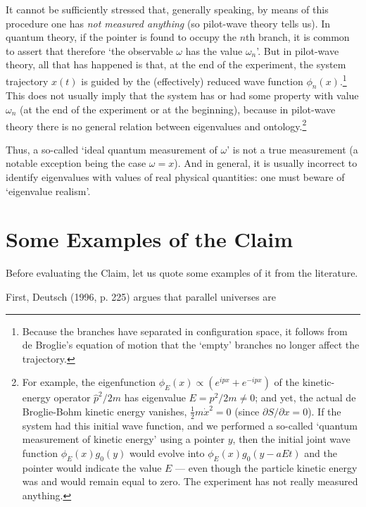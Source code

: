 \documentclass[12pt]{article}%
\begin{document}
It cannot be sufficiently stressed that, generally speaking, by means of this
procedure one has \textit{not measured anything} (so pilot-wave theory tells
us). In quantum theory, if the pointer is found to occupy the $n$th branch, it
is common to assert that therefore `the observable $\omega$ has the value
$\omega_{n}$'. But in pilot-wave theory, all that has happened is that, at the
end of the experiment, the system trajectory $x(t)$ is guided by the
(effectively) reduced wave function $\phi_{n}(x)$.\footnote{Because the
branches have separated in configuration space, it follows from de Broglie's
equation of motion that the `empty' branches no longer affect the trajectory.}
This does not usually imply that the system has or had some property with
value $\omega_{n}$ (at the end of the experiment or at the beginning), because
in pilot-wave theory there is no general relation between eigenvalues and
ontology.\footnote{For example, the eigenfunction $\phi_{E}(x)\propto
(e^{ipx}+e^{-ipx})$ of the kinetic-energy operator $\hat{p}^{2}/2m$ has
eigenvalue $E=p^{2}/2m\neq0$; and yet, the actual de Broglie-Bohm kinetic
energy vanishes, ${\frac{1}{2}}m\dot{x}^{2}=0$ (since $\partial S/\partial
x=0$). If the system had this initial wave function, and we performed a
so-called `quantum measurement of kinetic energy' using a pointer $y$, then
the initial joint wave function $\phi_{E}(x)g_{0}(y)$ would evolve into
$\phi_{E}(x)g_{0}(y-aEt)$ and the pointer would indicate the value $E$ ---
even though the particle kinetic energy was and would remain equal to zero.
The experiment has not really measured anything.}

Thus, a so-called `ideal quantum measurement of $\omega$' is not a true
measurement (a notable exception being the case $\omega=x$). And in general,
it is usually incorrect to identify eigenvalues with values of real physical
quantities: one must beware of `eigenvalue realism'.

\section{Some Examples of the Claim}

Before evaluating the Claim, let us quote some examples of it from the literature.

First, Deutsch (1996, p. 225) argues that parallel universes are
\end{document}
